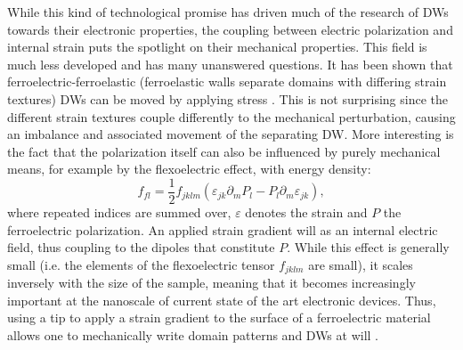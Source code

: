 While this kind of technological promise has driven much of the research of DWs towards their electronic properties, the coupling between electric polarization and internal strain puts the spotlight on their mechanical properties.
This field is much less developed and has many unanswered questions. 
It has been shown that ferroelectric-ferroelastic (ferroelastic walls separate domains with differing strain textures) DWs can be moved by applying stress \cite{Schneider2001}. This is not surprising since the different strain textures couple differently to the mechanical perturbation, causing an imbalance and associated movement of the separating DW.
More interesting is the fact that the polarization itself can also be influenced by purely mechanical means, for example by the flexoelectric effect, with energy density:
\begin{equation}
f_{fl} = \frac{1}{2}f_{jklm}(\varepsilon_{jk}\partial_mP_l-P_l\partial_m\varepsilon_{jk}),
\end{equation}
where repeated indices are summed over, $\varepsilon$ denotes the strain and $P$ the ferroelectric polarization. An applied strain gradient will as an internal electric field, thus coupling to the dipoles that constitute $P$.
While this effect is generally small (i.e. the elements of the flexoelectric tensor $f_{jklm}$ are small), it scales inversely with the size of the sample, meaning that it becomes increasingly important at the nanoscale of current state of the art electronic devices.
Thus, using a tip to apply a strain gradient to the surface of a ferroelectric material allows one to mechanically write domain patterns and DWs at will \cite{Lu2012}.

